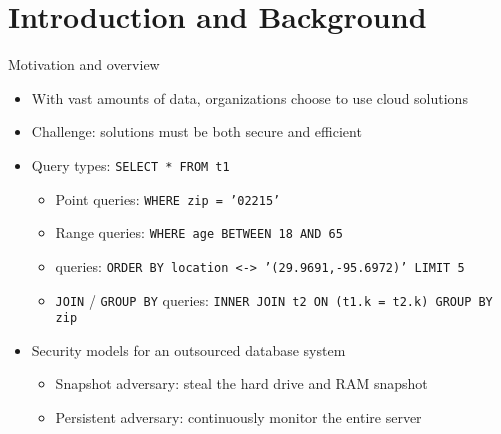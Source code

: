 \section{Introduction and Background}

	\begin{frame}{Motivation and overview}

		\begin{itemize}
			\item<1-> With vast amounts of data, organizations choose to use cloud solutions
			\item<1-> \alert{Challenge:} solutions must be both secure and efficient
			\item<2-> Query types: \texttt{SELECT * FROM t1 }
				\begin{itemize}
					\item<1,2,6-> Point queries: \texttt{WHERE zip = '02215'}
					\item<1,3,6-> Range queries: \texttt{WHERE age BETWEEN 18 AND 65}
					\item<1,4,6-> \knn{} queries: \texttt{ORDER BY location <-> '(29.9691,-95.6972)' LIMIT 5} %
					\item<1,5,6-> \texttt{JOIN} / \texttt{GROUP BY} queries: \texttt{INNER JOIN t2 ON (t1.k = t2.k) GROUP BY zip}
				\end{itemize}
			\item<6-> Security models for an outsourced database system
				\begin{itemize}
					\item<1-5,7> Snapshot adversary: steal the hard drive and RAM snapshot %
					\item<1-5,8> Persistent adversary: continuously monitor the entire server %
				\end{itemize}
		\end{itemize}

	\end{frame}

